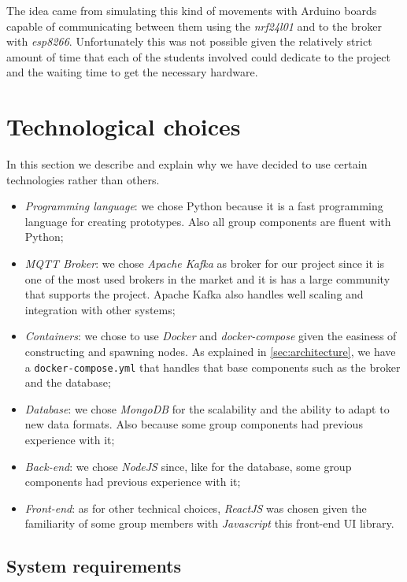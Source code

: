 \documentclass[conference]{IEEEtran}
\begin{document}
	The idea came from simulating this kind of movements with Arduino boards capable of communicating between them using the \textit{nrf24l01} and to the broker with \textit{esp8266}.
	Unfortunately this was not possible given the relatively strict amount of time that each of the students involved could dedicate to the project and the waiting time to get the necessary hardware.

\section{Technological choices}\label{sec:technological_choices}

	In this section we describe and explain why we have decided to use certain technologies rather than others.
	
	\begin{itemize}
		\item \textit{Programming language}: we chose Python because it is a fast programming language for creating prototypes. Also all group components are fluent with Python;
		\item \textit{MQTT Broker}: we chose \textit{Apache Kafka} as broker for our project since it is one of the most used brokers in the market and it is has a large community that supports the project. Apache Kafka also handles well scaling and integration with other systems;
		\item \textit{Containers}: we chose to use \textit{Docker} and \textit{docker-compose} given the easiness of constructing and spawning nodes. As explained in \ref{sec:architecture}, we have a \texttt{docker-compose.yml} that handles that base components such as the broker and the database;
		\item \textit{Database}: we chose \textit{MongoDB} for the scalability and the ability to adapt to new data formats. Also because some group components had previous experience with it;
		\item \textit{Back-end}: we chose \textit{NodeJS} since, like for the database, some group components had previous experience with it;
		\item \textit{Front-end}: as for other technical choices, \textit{ReactJS} was chosen given the familiarity of some group members with \textit{Javascript} this front-end UI library.
	\end{itemize}

	\subsection{System requirements}
	
\end{document}
